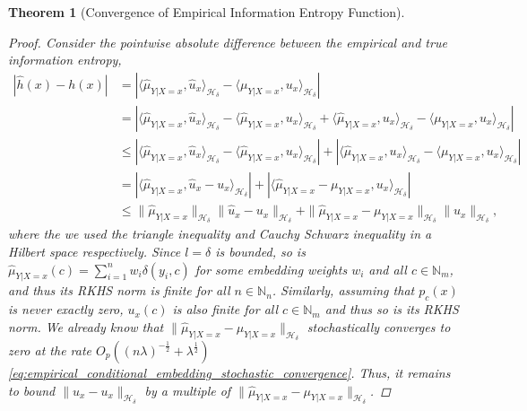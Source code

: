 \documentclass{article}
\newtheorem{theorem}{Theorem}[section]
\begin{document}
\begin{theorem}[Convergence of Empirical Information Entropy Function]
\begin{proof}
				Consider the pointwise absolute difference between the empirical and true information entropy,
				\begin{equation}
					\begin{aligned}
						| \hat{h}(x) - h(x) | &= | \langle \hat{\mu}_{Y | X = x}, \hat{u}_{x} \rangle_{\mathcal{H}_{\delta}} - \langle \mu_{Y | X = x}, u_{x} \rangle_{\mathcal{H}_{\delta}} | \\
						&= | \langle \hat{\mu}_{Y | X = x}, \hat{u}_{x} \rangle_{\mathcal{H}_{\delta}} - \langle \hat{\mu}_{Y | X = x}, u_{x} \rangle_{\mathcal{H}_{\delta}} + \langle \hat{\mu}_{Y | X = x}, u_{x} \rangle_{\mathcal{H}_{\delta}} - \langle \mu_{Y | X = x}, u_{x} \rangle_{\mathcal{H}_{\delta}} | \\
						&\leq | \langle \hat{\mu}_{Y | X = x}, \hat{u}_{x} \rangle_{\mathcal{H}_{\delta}} - \langle \hat{\mu}_{Y | X = x}, u_{x} \rangle_{\mathcal{H}_{\delta}} | + | \langle \hat{\mu}_{Y | X = x}, u_{x} \rangle_{\mathcal{H}_{\delta}} - \langle \mu_{Y | X = x}, u_{x} \rangle_{\mathcal{H}_{\delta}} | \\
						&= | \langle \hat{\mu}_{Y | X = x}, \hat{u}_{x} - u_{x} \rangle_{\mathcal{H}_{\delta}} | + | \langle \hat{\mu}_{Y | X = x} - \mu_{Y | X = x}, u_{x} \rangle_{\mathcal{H}_{\delta}} | \\
						&\leq \| \hat{\mu}_{Y | X = x} \|_{\mathcal{H}_{\delta}} \| \hat{u}_{x} - u_{x} \|_{\mathcal{H}_{\delta}} + \| \hat{\mu}_{Y | X = x} - \mu_{Y | X = x} \|_{\mathcal{H}_{\delta}} \| u_{x} \|_{\mathcal{H}_{\delta}},
					\label{eq:information_entropy_bound}
					\end{aligned}
				\end{equation}
				where the we used the triangle inequality and Cauchy Schwarz inequality in a Hilbert space respectively. Since $l = \delta$ is bounded, so is $\hat{\mu}_{Y | X = x}(c) = \sum_{i = 1}^{n} w_{i} \delta(y_{i}, c)$ for some embedding weights $w_{i}$ and all $c \in \mathbb{N}_{m}$, and thus its RKHS norm is finite for all $n \in \mathbb{N}_{n}$. Similarly, assuming that $p_{c}(x)$ is never exactly zero, $u_{x}(c)$ is also finite for all $c \in \mathbb{N}_{m}$ and thus so is its RKHS norm. We already know that $\| \hat{\mu}_{Y | X = x} - \mu_{Y | X = x} \|_{\mathcal{H}_{\delta}}$ stochastically converges to zero at the rate $O_{p}((n \lambda)^{-\frac{1}{2}} + \lambda^{\frac{1}{2}})$ \eqref{eq:empirical_conditional_embedding_stochastic_convergence}. Thus, it remains to bound $\| \hat{u}_{x} - u_{x} \|_{\mathcal{H}_{\delta}}$ by a multiple of $\| \hat{\mu}_{Y | X = x} - \mu_{Y | X = x} \|_{\mathcal{H}_{\delta}}$.
				

\end{proof}
\end{theorem}
\end{document}
